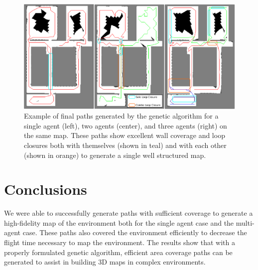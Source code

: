 \documentclass[letterpaper, 10 pt, conference]{ieeeconf}  %
\begin{document}
\begin{figure}
\centering
\includegraphics[width=1.0\linewidth]{paths.png}
\caption[Example of final paths generated by the genetic algorithm.]{Example of final paths generated by the genetic algorithm for a single agent (left), two agents (center), and three agents (right) on the same map. These paths show excellent wall coverage and loop closures both with themselves (shown in teal) and with each other (shown in orange) to generate a single well structured map.}
\label{fig:final_paths}
\end{figure}

\section{Conclusions}\label{conclusions}

We were able to successfully generate paths with sufficient coverage to generate a high-fidelity map of the environment both for the single agent case and the multi-agent case. These paths also covered the environment efficiently to decrease the flight time necessary to map the environment. The results show that with a properly formulated genetic algorithm, efficient area coverage paths can be generated to assist in building 3D maps in complex environments.

\end{document}

